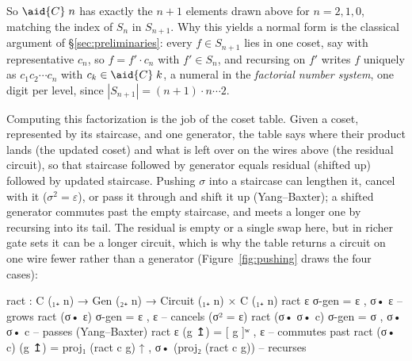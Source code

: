 \noindent So $\aid{C}\;n$ has exactly the $n{+}1$ elements drawn above
for $n = 2, 1, 0$, matching the index of $S_n$ in $S_{n+1}$.  Why this yields
a normal form is the classical argument of \S\ref{sec:preliminaries}:
every $f \in S_{n+1}$ lies in one coset, say with representative $c_n$,
so $f = f' \cdot c_n$ with $f' \in S_n$, and recursing on $f'$ writes $f$
uniquely as $c_1 c_2 \cdots c_n$ with $c_k \in \aid{C}\;k$, a numeral
in the \emph{factorial number system}, one digit per level, since
$|S_{n+1}| = (n{+}1) \cdot n \cdots 2$.

Computing this factorization is the job of the coset table.
Given a coset, represented by its staircase, and one generator, the
table says where their product lands (the updated coset) and what
is left over on the wires above (the residual circuit), so that
staircase followed by generator equals residual (shifted up) followed by
updated staircase.
Pushing $\sigma$ into a staircase can lengthen it, cancel with it ($\sigma^2 =
\varepsilon$), or pass it through and shift it up (Yang--Baxter); a
shifted generator commutes past the empty staircase, and meets a longer
one by recursing into its tail.  The residual is empty or a single swap here, but in richer
gate sets it can be a longer circuit, which is why the table returns a
circuit on one wire fewer rather than a generator
(Figure~\ref{fig:pushing} draws the four cases):

\begin{center}
\begin{minipage}[c]{0.65\linewidth}
\begingroup\setlength{\mathindent}{0pt}
\begin{code}
ract : C (₁₊ n) → Gen (₂₊ n) → Circuit (₁₊ n) × C (₁₊ n)
ract ε σ-gen = ε , σ• ε             -- grows
ract (σ• ε) σ-gen = ε , ε           -- cancels (σ² = ε)
ract (σ• σ• c) σ-gen = σ , σ• σ• c  -- passes (Yang–Baxter)
ract ε (g ↥) = [ g ]ʷ , ε           -- commutes past
ract (σ• c) (g ↥) = proj₁ (ract c g) ↑ , σ• (proj₂ (ract c g))  -- recurses
\end{code}
\endgroup
\end{minipage}\hspace{0.5em}%
\begin{minipage}[c]{0.30\linewidth}\raggedright
  \;\scalebox{0.7}{$\approx$}\;
\end{minipage}
\end{center}

